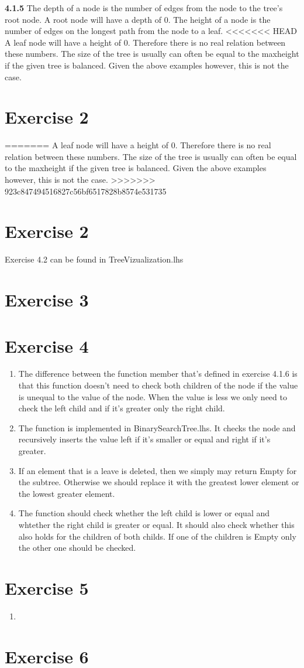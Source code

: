 \documentclass{article}
\begin{document}
\textbf{4.1.5}
The depth of a node is the number of edges from the node to the tree's root node.
A root node will have a depth of 0.
The height of a node is the number of edges on the longest path from the node to a leaf.
<<<<<<< HEAD
A leaf node will have a height of 0. Therefore there is no real relation between these numbers. The size of the tree is usually can often be equal to the maxheight if the given tree is balanced. Given the above examples however, this is not the case.
\section*{Exercise 2}
=======
A leaf node will have a height of 0. Therefore there is no real relation between these numbers. The size of the tree is usually can often be equal to the maxheight if the given tree is balanced. Given the above examples however, this is not the case. 
>>>>>>> 923c847494516827c56bf6517828b8574e531735

\section*{Exercise 2}
Exercise 4.2 can be found in TreeVizualization.lhs

\section*{Exercise 3}


\section*{Exercise 4}
\begin{enumerate}
  \item The difference between the function member that's defined in exercise 4.1.6 is that this function doesn't need to check both children of the node if the value is unequal to the value of the node. When the value is less we only need to check the left child and if it's greater only the right child.
  \item The function is implemented in BinarySearchTree.lhs. It checks the node and recursively inserts the value left if it's smaller or equal and right if it's greater.
  \item If an element that is a leave is deleted, then we simply may return Empty for the subtree. Otherwise we should replace it with the greatest lower element or the lowest greater element.
  \item The function should check whether the left child is lower or equal and whtether the right child is greater or equal. It should also check whether this also holds for the children of both childs. If one of the children is Empty only the other one should be checked.
\end{enumerate}

\section*{Exercise 5}
\begin{enumerate}
  \item
\end{enumerate}

\section*{Exercise 6}
\end{document}
